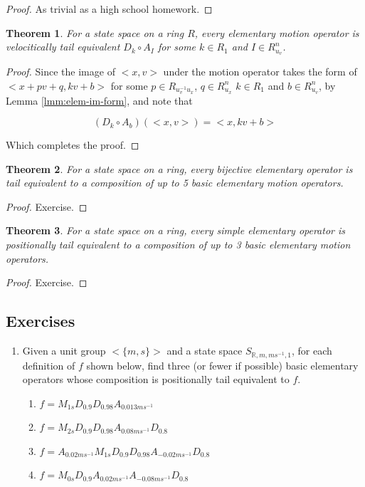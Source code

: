 \documentclass{book}
\newtheorem{theorem}{Theorem}
\theoremstyle{definition}\newtheorem{mechanism}{Mechanism}
\theoremstyle{remark}\newtheorem*{remark}{Remark}
\begin{document}
\begin{proof}
	As trivial as a high school homework.
\end{proof}

\begin{theorem}
	For a state space on a ring $R$, every elementary motion operator is velocitically tail equivalent $D_k \circ A_I$  for some $k \in R_1$ and $I \in R_{u_v}^n$.
\end{theorem}

\begin{proof}
	Since the image of $<x, v>$ under the motion operator takes the form of $<x + pv + q, kv + b>$ for some  $p \in R_{u_v^{-1}u_x}$, $q \in R_{u_x}^n$ $k\in R_{1}$ and $b\in R_{u_v}^n$, by Lemma \ref{lmm:elem-im-form}, and note that
	
	\begin{equation*}
		(D_k \circ A_b)(<x, v>) = <x, kv + b>
	\end{equation*} 
	
	Which completes the proof.
\end{proof}

\begin{theorem}
	For a state space on a ring, every bijective elementary operator is tail equivalent to a composition of up to 5 basic elementary motion operators.
\end{theorem}

\begin{proof}
	Exercise.
\end{proof}

\begin{theorem}
	For a state space on a ring, every simple elementary operator is positionally tail equivalent to a composition of up to 3 basic elementary motion operators.
\end{theorem}

\begin{proof}
	Exercise.
\end{proof}

\subsection*{Exercises}

\begin{enumerate}
	\item Given a unit group $<\{m , s\}>$ and a state space $S_{\mathbb R, m, ms^{-1}, 1}$, for each definition of $f$ shown below, find three (or fewer if possible) basic elementary operators whose composition is positionally tail equivalent to $f$.
	\begin{enumerate}
		\item $f = M_{1s}D_{0.9}D_{0.98}A_{0.013ms^{-1}}$
		\item $f = M_{2s}D_{0.9}D_{0.98}A_{0.08ms^{-1}}D_{0.8}$
		\item $f = A_{0.02ms^{-1}}M_{1s}D_{0.9}D_{0.98}A_{-0.02ms^{-1}}D_{0.8}$
		\item $f = M_{0s}D_{0.9}A_{0.02ms^{-1}}A_{-0.08ms^{-1}}D_{0.8}$
	\end{enumerate}
\end{enumerate}
\end{document}
